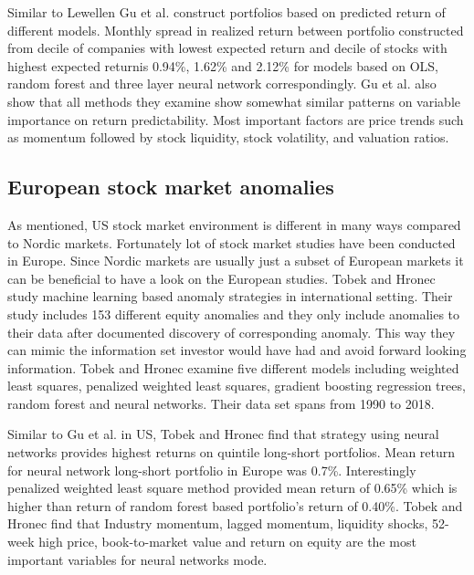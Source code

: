 \documentclass{article}
\begin{document}

Similar to Lewellen \citeyear{Lewellen2015} Gu et al. construct portfolios based on predicted return of different models. Monthly spread in realized return between portfolio constructed from decile of companies with lowest expected return and decile of stocks with highest expected return\footnotemark is 0.94\%, 1.62\% and 2.12\% for models based on OLS, random forest and three layer neural network correspondingly. Gu et al. also show that all methods they examine show somewhat similar patterns on variable importance on return predictability. Most important factors are price trends such as momentum followed by stock liquidity, stock volatility, and valuation ratios. \par


\subsection{European stock market anomalies}\label{EuropeanStockMarketAnomalies}

As mentioned, US stock market environment is different in many ways compared to Nordic markets. Fortunately lot of stock market studies have been conducted in Europe. Since Nordic markets are usually just a subset of European markets it can be beneficial to have a look on the European studies. Tobek and Hronec \citeyear{TOBEK2021100588} study machine learning based anomaly strategies in international setting. Their study includes 153 different equity anomalies and they only include anomalies to their data after documented discovery of corresponding anomaly. This way they can mimic the information set investor would have had and avoid forward looking information. Tobek and Hronec examine five different models including weighted least squares, penalized weighted least squares, gradient boosting regression trees, random forest and neural networks. Their data set spans from 1990 to 2018. \par

Similar to Gu et al. \citeyear{guetal} in US, Tobek and Hronec find that strategy using neural networks provides highest returns on quintile long-short portfolios. Mean return for neural network long-short portfolio in Europe was 0.7\%. Interestingly penalized weighted least square method provided mean return of 0.65\% which is higher than return of random forest based portfolio's return of 0.40\%. Tobek and Hronec find that Industry momentum, lagged momentum, liquidity shocks, 52-week high price, book-to-market value and return on equity are the most important variables for neural networks mode\footnotemark. \par
\end{document}
